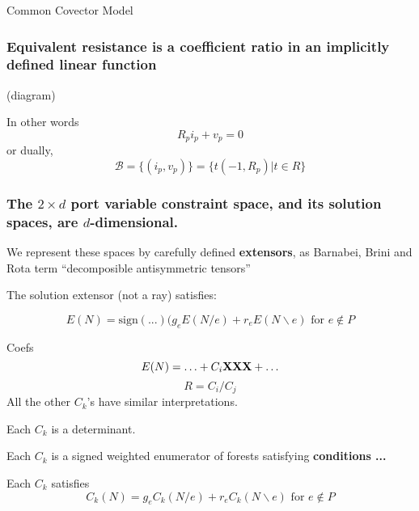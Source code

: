 \documentclass{beamer}
\begin{document}
\begin{frame}{Common Covector Model}

\end{frame}







\begin{frame}
\frametitle{Equivalent resistance is a coefficient ratio in an 
implicitly defined linear function}

(diagram)

In other words
\[
R_pi_p + v_p = 0
\]
or dually,
\[
\mathcal{B} = \{(i_p,v_p)\}
= \{ t(-1, R_p) | t\in R\}
\]

\end{frame}


\begin{frame}
\frametitle{The $2\times d$ port variable constraint space, 
and its solution spaces, are $d$-dimensional.}

We represent these spaces by carefully defined
\textbf{extensors}, as Barnabei, Brini and Rota \cite{exteriorCalc}
term ``decomposible antisymmetric tensors''

The solution extensor (not a ray) satisfies:

\[
E(N) = \text{sign}(...)(g_e E(N/e) + r_e E(N\backslash e)
\text{\ for\ }e\not\in P
\]

\end{frame}



\begin{frame}{Coefs}
\[
E(N) = \ldots + C_i\mbox{\bf XXX} + \ldots
\]
\[
R = C_i/C_j
\]
All the other $C_k$'s have similar interpretations.

Each $C_k$ is a determinant.

Each $C_k$ is a signed weighted enumerator of
forests satisfying \textbf{conditions ...}

Each $C_k$ satisfies
\[
C_k(N) = g_e C_k(N/e) + r_e C_k(N\backslash e)
\text{\ for\ }e\not\in {P}
\]

\end{frame}
\end{document}

